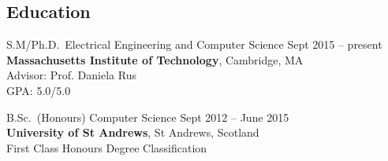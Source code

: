 \documentclass[line,margin]{cv}
\begin{document}
\address{Email: \href{mailto:wallar@mit.edu}{wallar@mit.edu}
\\Website: \href{http://wallar.me}
{http://wallar.me}}
\address{32 Vassar St. Room 376, Cambridge, MA 02139}

\begin{resume}

%

\section{Education}

S.M/Ph.D.\ Electrical Engineering and Computer Science
\hfill Sept 2015 -- present\\
\textbf{Massachusetts Institute of Technology}, Cambridge, MA\\
Advisor: Prof. Daniela Rus\\
GPA: 5.0/5.0

%
%

B.Sc.\ (Honours) Computer Science
\hfill Sept 2012 -- June 2015 \\
\textbf{University of St Andrews}, St Andrews, Scotland\\
First Class Honours Degree Classification\\


\end{resume}
\end{document}
